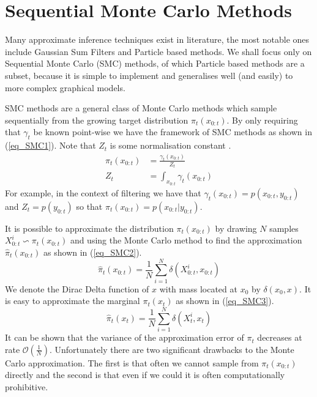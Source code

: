 \section{Sequential Monte Carlo Methods}
\label{sec_asir}
Many approximate inference techniques exist in literature, the most notable ones include Gaussian Sum Filters \cite{gsf1} and Particle based methods. We shall focus only on Sequential Monte Carlo (SMC) methods, of which Particle based methods are a subset, because it is simple to implement and generalises well (and easily) to more complex graphical models. 

SMC methods are a general class of Monte Carlo methods which sample sequentially from the growing target distribution $\pi_t(x_{0:t})$. By only requiring that $\gamma_t$ be known point-wise we have the framework of SMC methods as shown in (\ref{eq_SMC1}). Note that $Z_t$ is some normalisation constant \cite{pftut}.
\begin{equation}
\begin{aligned}
\pi_t(x_{0:t}) &= \frac{\gamma_t(x_{0:t})}{Z_t} \\
Z_t &= \int_{x_{0:t}} \gamma_t(x_{0:t})
\end{aligned}
\label{eq_SMC1}
\end{equation} 
For example, in the context of filtering we have that $\gamma_t(x_{0:t}) = p(x_{0:t},y_{0:t})$ and $Z_t = p(y_{0:t})$ so that $\pi_t(x_{0:t}) = p(x_{0:t}|y_{0:t})$. 

It is possible to approximate the distribution $\pi_t(x_{0:t})$ by drawing $N$ samples $X_{0:t}^i \backsim \pi_t(x_{0:t})$ and using the Monte Carlo method to find the approximation $\hat{\pi}_t(x_{0:t})$ as shown in (\ref{eq_SMC2}).
\begin{equation}
\hat{\pi}_t(x_{0:t}) = \frac{1}{N}\sum_{i=1}^N \delta(X^i_{0:t}, x_{0:t})
\label{eq_SMC2}
\end{equation}
We denote the Dirac Delta function of $x$ with mass located at $x_0$ by $\delta(x_0,x)$. It is easy to approximate the marginal $\pi_t(x_{t})$ as shown in (\ref{eq_SMC3}).
\begin{equation}
\hat{\pi}_t(x_{t}) = \frac{1}{N}\sum_{i=1}^N \delta(X^i_{t}, x_{t})
\label{eq_SMC3}
\end{equation}
It can be shown that the variance of the approximation error of $\pi_t$ decreases at rate $\mathcal{O}(\frac{1}{N})$. Unfortunately there are two significant drawbacks to the Monte Carlo approximation. The first is that often we cannot sample from $\pi_t(x_{0:t})$ directly and the second is that even if we could it is often computationally prohibitive. 

